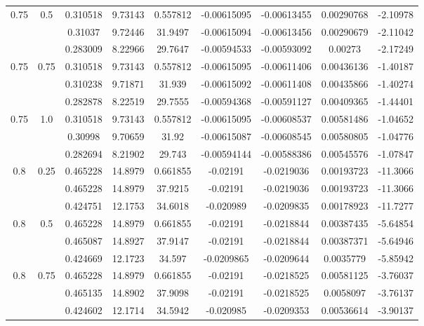 \documentclass[11pt]{article}
\begin{document}
\begin{figure}[h]
\begin{tabular}{|c|c|c|c|c|c|c|c|c|}
\multirow{3}{*}{0.75} & \multirow{3}{*}{0.5} & 0.310518 & 9.73143 & 0.557812 & -0.00615095 & -0.00613455 & 0.00290768 & -2.10978\\\cline{3-9}
 &  & 0.31037 & 9.72446 & 31.9497 & -0.00615094 & -0.00613456 & 0.00290679 & -2.11042\\\cline{3-9}
 &  & 0.283009 & 8.22966 & 29.7647 & -0.00594533 & -0.00593092 & 0.00273 & -2.17249\\\hline
\multirow{3}{*}{0.75} & \multirow{3}{*}{0.75} & 0.310518 & 9.73143 & 0.557812 & -0.00615095 & -0.00611406 & 0.00436136 & -1.40187\\\cline{3-9}
 &  & 0.310238 & 9.71871 & 31.939 & -0.00615092 & -0.00611408 & 0.00435866 & -1.40274\\\cline{3-9}
 &  & 0.282878 & 8.22519 & 29.7555 & -0.00594368 & -0.00591127 & 0.00409365 & -1.44401\\\hline
\multirow{3}{*}{0.75} & \multirow{3}{*}{1.0} & 0.310518 & 9.73143 & 0.557812 & -0.00615095 & -0.00608537 & 0.00581486 & -1.04652\\\cline{3-9}
 &  & 0.30998 & 9.70659 & 31.92 & -0.00615087 & -0.00608545 & 0.00580805 & -1.04776\\\cline{3-9}
 &  & 0.282694 & 8.21902 & 29.743 & -0.00594144 & -0.00588386 & 0.00545576 & -1.07847\\\hline
\multirow{3}{*}{0.8} & \multirow{3}{*}{0.25} & 0.465228 & 14.8979 & 0.661855 & -0.02191 & -0.0219036 & 0.00193723 & -11.3066\\\cline{3-9}
 &  & 0.465228 & 14.8979 & 37.9215 & -0.02191 & -0.0219036 & 0.00193723 & -11.3066\\\cline{3-9}
 &  & 0.424751 & 12.1753 & 34.6018 & -0.020989 & -0.0209835 & 0.00178923 & -11.7277\\\hline
\multirow{3}{*}{0.8} & \multirow{3}{*}{0.5} & 0.465228 & 14.8979 & 0.661855 & -0.02191 & -0.0218844 & 0.00387435 & -5.64854\\\cline{3-9}
 &  & 0.465087 & 14.8927 & 37.9147 & -0.02191 & -0.0218844 & 0.00387371 & -5.64946\\\cline{3-9}
 &  & 0.424669 & 12.1723 & 34.597 & -0.0209865 & -0.0209644 & 0.0035779 & -5.85942\\\hline
\multirow{3}{*}{0.8} & \multirow{3}{*}{0.75} & 0.465228 & 14.8979 & 0.661855 & -0.02191 & -0.0218525 & 0.00581125 & -3.76037\\\cline{3-9}
 &  & 0.465135 & 14.8902 & 37.9098 & -0.02191 & -0.0218525 & 0.0058097 & -3.76137\\\cline{3-9}
 &  & 0.424602 & 12.1714 & 34.5942 & -0.020985 & -0.0209353 & 0.00536614 & -3.90137\\\hline

\end{tabular}
\end{figure}
\end{document}
